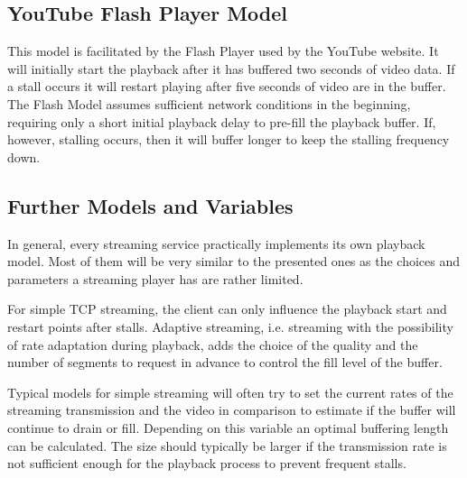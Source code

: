   
\subsection{YouTube Flash Player Model}
This model is facilitated by the Flash Player used by the YouTube website. It will initially start the playback after it has buffered two seconds of video data. If a stall occurs it will restart playing after five seconds of video are in the buffer.
The Flash Model assumes sufficient network conditions in the beginning, requiring only a short initial playback delay to pre-fill the playback buffer. If, however, stalling occurs, then it will buffer longer to keep the stalling frequency down.


\subsection{Further Models and Variables}
In general, every streaming service practically implements its own playback model. Most of them will be very similar to the presented ones as the choices and parameters a streaming player has are rather limited.

For simple TCP streaming, the client can only influence the playback start and restart points after stalls. Adaptive streaming, i.e. streaming with the possibility of rate adaptation during playback, adds the choice of the quality and the number of segments to request in advance to control the fill level of the buffer.

Typical models for simple streaming will often try to set the current rates of the streaming transmission and the video in comparison to estimate if the buffer will continue to drain or fill. Depending on this variable an optimal buffering length can be calculated. The size should typically be larger if the transmission rate is not sufficient enough for the playback process to prevent frequent stalls.

